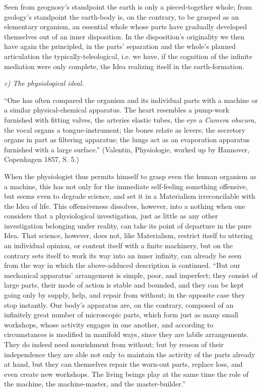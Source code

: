 \documentclass[12pt]{book}
\begin{document}
Seen from geognosy's standpoint the earth is only a pieced-together whole; from geology's standpoint the
earth-body is, on the contrary, to be grasped as an elementary organism, an essential whole whose parts
have gradually developed themselves out of an inner disposition. In the disposition's originality we then
have again the principled, in the parts' separation and the whole's planned articulation the
typically-teleological, i.e. we have, if the cognition of the infinite mediation were only complete, the
Idea realizing itself in the earth-formation.
\begin{center}\emph{c) The physiological ideal.}\end{center}

``One has often compared the organism and its individual parts with a machine or a similar
physical-chemical apparatus. The heart resembles a pump-work furnished with fitting valves, the arteries
elastic tubes, the eye a \textit{Camera obscura}, the vocal organs a tongue-instrument; the bones relate
as levers; the secretory organs in part as filtering apparatus; the lungs act as an evaporation apparatus
furnished with a large surface.'' (Valentin, Physiologie, worked up by Hannover, Copenhagen 1857, S. 5.)

When the physiologist thus permits himself to grasp even the human organism as a machine, this has not
only for the immediate self-feeling something offensive, but seems even to degrade science, and set it in
a Materialism irreconcilable with the Idea of life. This offensiveness dissolves, however, into a nothing
when one considers that a physiological investigation, just as little as any other investigation
belonging under reality, can take its point of departure in the pure Idea. That science, however, does
not, like Materialism, restrict itself to uttering an individual opinion, or content itself with a finite
machinery, but on the contrary sets itself to work its way into an inner infinity, can already be seen
from the way in which the above-adduced description is continued. ``But our mechanical apparatus'
arrangement is simple, poor, and imperfect; they consist of large parts, their mode of action is stable
and bounded, and they can be kept going only by supply, help, and repair from without; in the opposite
case they stop instantly. Our body's apparatus are, on the contrary, composed of an infinitely great
number of microscopic parts, which form just as many small workshops, whose activity engages in one
another, and according to circumstances is modified in manifold ways, since they are labile
arrangements. They do indeed need nourishment from without; but by
reason of their independence they are able not only to maintain the activity of the parts already at
hand, but they can themselves repair the worn-out parts, replace loss, and even create new workshops. The
living beings play at the same time the role of the machine, the machine-master, and the master-builder.''
\end{document}
